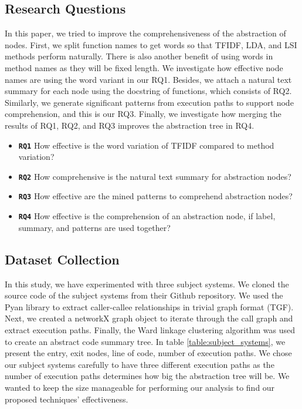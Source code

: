 \subsection{Research Questions}
In this paper, we tried to improve the comprehensiveness of the abstraction of nodes. First, we split function names to get words so that TFIDF, LDA, and LSI methods perform naturally. There is also another benefit of using words in method names as they will be fixed length. We investigate how effective node names are using the word variant in our RQ1. Besides, we attach a natural text summary for each node using the docstring of functions, which consists of RQ2. Similarly, we generate significant patterns from execution paths to support node comprehension, and this is our RQ3. Finally, we investigate how merging the results of RQ1, RQ2, and RQ3 improves the abstraction tree in RQ4. 

\begin{itemize}
    
    \item \textbf{\texttt{RQ1}} How effective is the word variation of TFIDF compared to method variation?
    \item \textbf{\texttt{RQ2}} How comprehensive is the natural text summary for abstraction nodes?
    \item \textbf{\texttt{RQ3}} How effective are the mined patterns to comprehend abstraction nodes?
    \item \textbf{\texttt{RQ4}} How effective is the comprehension of an abstraction node, if label, summary, and patterns are used together?
\end{itemize}

\subsection{Dataset Collection}
In this study, we have experimented with three subject systems. We cloned the source code of the subject systems from their Github repository. We used the Pyan library to extract caller-callee relationships in trivial graph format (TGF). Next, we created a networkX graph object to iterate through the call graph and extract execution paths. Finally, the Ward linkage clustering algorithm was used to create an abstract code summary tree. In table \ref{table:subject_systems}, we present the entry, exit nodes, line of code, number of execution paths. We chose our subject systems carefully to have three different execution paths as the number of execution paths determines how big the abstraction tree will be. We wanted to keep the size manageable for performing our analysis to find our proposed techniques' effectiveness. 

